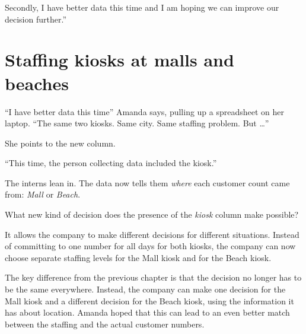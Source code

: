 \documentclass[
  12pt,
  letterpaper,
  DIV=11,
  numbers=noendperiod]{scrreprt}
\begin{document}
Secondly, I have better data this time and I am hoping we can improve
our decision further.''

\section{Staffing kiosks at malls and
beaches}\label{staffing-kiosks-at-malls-and-beaches}

``I have better data this time'' Amanda says, pulling up a spreadsheet
on her laptop. ``The same two kiosks. Same city. Same staffing problem.
But \ldots{}''

She points to the new column.

``This time, the person collecting data included the kiosk.''

The interns lean in. The data now tells them \emph{where} each customer
count came from: \emph{Mall} or \emph{Beach}.

\begin{tcolorbox}[enhanced jigsaw, colback=white, leftrule=.75mm, toprule=.15mm, bottomtitle=1mm, breakable, coltitle=black, toptitle=1mm, title={Quick Check}, opacitybacktitle=0.6, colbacktitle=quarto-callout-note-color!10!white, arc=.35mm, left=2mm, colframe=quarto-callout-note-color-frame, titlerule=0mm, rightrule=.15mm, bottomrule=.15mm, opacityback=0]

What new kind of decision does the presence of the \emph{kiosk} column
make possible?

\end{tcolorbox}

\begin{tcolorbox}[enhanced jigsaw, colback=white, leftrule=.75mm, toprule=.15mm, bottomtitle=1mm, breakable, coltitle=black, toptitle=1mm, title={Suggested answer}, opacitybacktitle=0.6, colbacktitle=quarto-callout-note-color!10!white, arc=.35mm, left=2mm, colframe=quarto-callout-note-color-frame, titlerule=0mm, rightrule=.15mm, bottomrule=.15mm, opacityback=0]

It allows the company to make different decisions for different
situations. Instead of committing to one number for all days for both
kiosks, the company can now choose separate staffing levels for the Mall
kiosk and for the Beach kiosk.

\end{tcolorbox}

The key difference from the previous chapter is that the decision no
longer has to be the same everywhere. Instead, the company can make one
decision for the Mall kiosk and a different decision for the Beach
kiosk, using the information it has about location. Amanda hoped that
this can lead to an even better match between the staffing and the
actual customer numbers.
\end{document}
